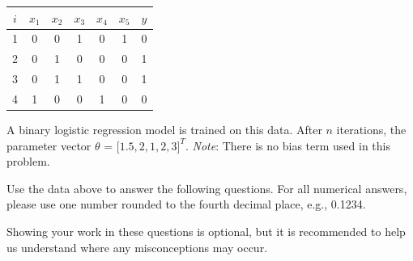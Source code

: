 \documentclass[11pt,addpoints,answers]{exam}
\newcommand{\thetav     }{\boldsymbol \theta     }
\begin{document}
\begin{questions}
\begin{center}
\begin{tabular}{|c|c|c|c|c|c|c|}
\hline
$i$ & $x_{1}$ & $x_{2}$ & $x_{3}$ & $x_{4}$ & $x_{5}$ & $y$ \\ \hline
1 & 0 & 0 & 1 & 0 & 1 & 0   \\ \hline
2 & 0 & 1 & 0 & 0 & 0 & 1     \\ \hline
3 & 0 & 1 & 1 & 0 & 0 & 1    \\ \hline
4 & 1 & 0 & 0 & 1 & 0 & 0   \\ \hline

\end{tabular}
\end{center}

A binary logistic regression model is trained on this data. After $n$ iterations, the parameter vector $\theta$ = $\lbrack 1.5, 2, 1, 2, 3 \rbrack^T$. \textit{Note}: There is no bias term used in this problem.

Use the data above to answer the following questions. For all numerical answers, please use one number rounded to the  fourth decimal place, e.g., 0.1234.

Showing your work in these questions is optional, but it is recommended to help us understand where any misconceptions may occur.

\end{questions}
\end{document}

